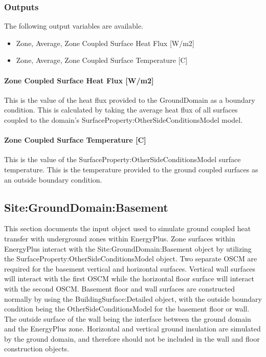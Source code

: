 \subsubsection{Outputs}\label{outputs-1-015}

The following output variables are available.

\begin{itemize}
\tightlist
\item
  Zone, Average, Zone Coupled Surface Heat Flux {[}W/m2{]}
\item
  Zone, Average, Zone Coupled Surface Temperature {[}C{]}
\end{itemize}

\paragraph{Zone Coupled Surface Heat Flux {[}W/m2{]}}\label{zone-coupled-surface-heat-flux-wm2}

This is the value of the heat flux provided to the GroundDomain as a boundary condition. This is calculated by taking the average heat flux of all surfaces coupled to the domain's SurfaceProperty:OtherSideConditionsModel model.

\paragraph{Zone Coupled Surface Temperature {[}C{]}}\label{zone-coupled-surface-temperature-c}

This is the value of the SurfaceProperty:OtherSideConditionsModel surface temperature. This is the temperature provided to the ground coupled surfaces as an outside boundary condition.

\subsection{Site:GroundDomain:Basement}\label{sitegrounddomainbasement}

This section documents the input object used to simulate ground coupled heat transfer with underground zones within EnergyPlus. Zone surfaces within EnergyPlus interact with the Site:GroundDomain:Basement object by utilizing the SurfaceProperty:OtherSideConditionsModel object. Two separate OSCM are required for the basement vertical and horizontal surfaces. Vertical wall surfaces will interact with the first OSCM while the horizontal floor surface will interact with the second OSCM. Basement floor and wall surfaces are constructed normally by using the BuildingSurface:Detailed object, with the outside boundary condition being the OtherSideConditionsModel for the basement floor or wall. The outside surface of the wall being the interface between the ground domain and the EnergyPlus zone. Horizontal and vertical ground insulation are simulated by the ground domain, and therefore should not be included in the wall and floor construction objects.

